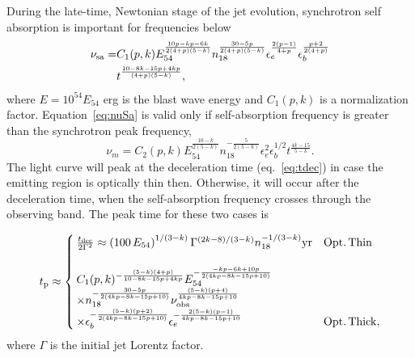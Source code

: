 \documentclass[usenatbib,fleqn]{mnras}
\begin{document}
During the late-time, Newtonian stage of the jet evolution,
synchrotron self absorption is important for frequencies below
\begin{align}
  \nu_{\rm sa}=&C_1(p, k) E_{54}^{\frac{10 p-k p -6 k}{2 (4+p) (5-k)}} n_{18}^{\frac{30 - 5 p}{2 (4 + p) (5 - k)}}
  \epsilon_e^{\frac{2 (p-1)}{4+p}} \epsilon_b^{\frac{p+2}{2 (4+p)}}\nonumber\\
  &t^{\frac{10 - 8 k - 15 p + 4 k p}{(4 + p) (5 - k)}}, 
\label{eq:nuSa} 
\end{align}
%
where $E = 10^{54}E_{54}$ erg is the blast wave energy and $C_1(p, k)$
is a normalization factor.  Equation~\eqref{eq:nuSa} is valid only if
self-absorption frequency is greater than the synchrotron peak
frequency,
\begin{equation}
\nu_m=C_2(p, k) E_{54}^{\frac{10-k}{2 (5-k)}} n_{18}^{-\frac{5}{2
    (5-k)}}  \epsilon_e^2  \epsilon_b^{1/2}  t^{\frac{4 k-15}{5-k}}.
\label{eq:num}
\end{equation}
%
The light curve will peak at the deceleration time (eq.~\ref{eq:tdec})
in case the emitting region is optically thin then. Otherwise, it will
occur after the deceleration time, when the self-absorption frequency
crosses through the observing band. The peak time for these two cases
is

\begin{align}
t_{\rm p} \approx
\begin{cases}
  \frac{t_{\rm dec}}{2 \Gamma^2} \approx \left(100 \,
    E_{54}\right)^{1/(3-k)}  \Gamma^{(2k - 8)/(3-k)}
  n_{18}^{-1/(3-k)} {\rm yr} & {\rm Opt.\, Thin}\\\\
  C_1(p, k)^{-\frac{(5 - k) (4 + p)}{10 - 8 k - 15 p + 4 k
      p}}E_{54}^{-\frac{-k p-6 k+10 p}{2 (4 k p-8 k-15 p+10)}}\\
  \times n_{18}^{-\frac{30-5 p}{2 (4 k p-8 k-15 p+10)}} \nu_{\rm
    obs}^{\frac{(5-k) (p+4)}{4 k p-8 k-15 p+10}}\\
  \times \epsilon_b^{-\frac{(5-k) (p+2)}{2 (4 k p-8 k-15 p+10)}}
  \epsilon_e^{-\frac{2 (5-k) (p-1)}{4 k p-8 k-15 p+10}} & {\rm
    Opt.\, Thick},
\end{cases}
\label{eq:tpeakGen}
\end{align}
%
where $\Gamma$ is the initial jet Lorentz factor. 
\end{document}
